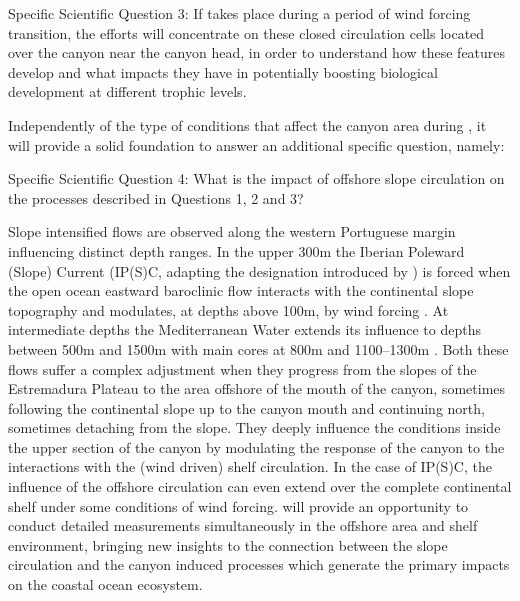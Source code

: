 \textsf{Specific Scientific Question 3:} If \proj takes place during a
period of wind forcing transition, the efforts will concentrate on
these closed circulation cells located over the canyon near the canyon
head, in order to understand how these features develop and what
impacts they have in potentially boosting biological development at
different trophic levels.

Independently of the type of conditions that affect the \naz canyon
area during \proje, it will provide a solid foundation to answer an
additional specific question, namely:

\textsf{Specific Scientific Question 4:} What is the impact of
offshore slope circulation on the processes described in
\textsf{Questions 1, 2 and 3}?

Slope intensified flows are observed along the western Portuguese
margin influencing distinct depth ranges. In the upper 300m the
Iberian Poleward (Slope) Current (IP(S)C, adapting the designation
introduced by \cite{peliz03}) is forced when the open ocean eastward
baroclinic flow interacts with the continental slope topography and
modulates, at depths above 100m, by wind forcing
\cite{frouin90,haynes90}. At intermediate depths the Mediterranean
Water extends its influence to depths between 500m and 1500m with main
cores at 800m and 1100--1300m \cite{fiuza98}. Both these flows suffer
a complex adjustment when they progress from the slopes of the
Estremadura Plateau to the area offshore of the mouth of the \naz
canyon, sometimes following the continental slope up to the canyon
mouth and continuing north, sometimes detaching from the slope. They
deeply influence the conditions inside the upper section of the canyon
by modulating the response of the canyon to the interactions with the
(wind driven) shelf circulation. In the case of IP(S)C, the influence
of the offshore circulation can even extend over the complete
continental shelf under some conditions of wind forcing. \proj will
provide an opportunity to conduct detailed measurements simultaneously
in the offshore area and shelf environment, bringing new insights to
the connection between the slope circulation and the canyon induced
processes which generate the primary impacts on the coastal ocean
ecosystem.

\par

